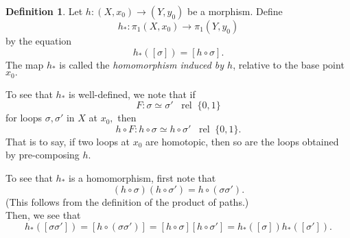 \documentclass[12pt]{article}
\theoremstyle{definition}
\numberwithin{thm}{section}
\newtheorem{defn}[thm]{Definition}
\newcommand{\rel}{\;\;\operatorname{rel}\;}
\begin{document}
\begin{defn}
	Let $h:(X, x_0) \to (Y, y_0)$ be a morphism. Define
	\begin{equation*} 
		h_* : \pi_1(X, x_0) \to \pi_1(Y, y_0)
	\end{equation*}
	by the equation
	\begin{equation*} 
		h_*([\sigma]) = [h\circ \sigma].
	\end{equation*}
	The map $h_*$ is called the \emph{homomorphism induced by $h$}, relative to the base point $x_0.$
\end{defn}
To see that $h_*$ is well-defined, we note that if 
\begin{equation*} 
	F : \sigma \simeq \sigma' \rel \{0, 1\}
\end{equation*}
for loops $\sigma, \sigma'$ in $X$ at $x_0,$ then
\begin{equation*} 
	h \circ F : h\circ \sigma \simeq h\circ\sigma' \rel \{0, 1\}.
\end{equation*}
That is to say, if two loops at $x_0$ are homotopic, then so are the loops obtained by pre-composing $h.$

To see that $h_*$ is a homomorphism, first note that
\begin{equation*} 
	(h \circ \sigma)(h \circ \sigma') = h\circ(\sigma\sigma').
\end{equation*}
(This follows from the definition of the product of paths.)\\
Then, we see that
\begin{equation*} 
	h_*([\sigma\sigma']) = [h\circ(\sigma\sigma')] = [h\circ\sigma][h\circ\sigma'] = h_*([\sigma])h_*([\sigma']).
\end{equation*}
\end{document}
